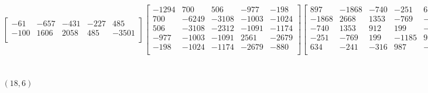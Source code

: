 \documentclass[12pt]{amsart}
\theoremstyle{plain}
\theoremstyle{definition}
\begin{document}
\begin{landscape}
\begin{align*}
\begin{bmatrix}
 -61  &   -657  &   -431  &   -227  &   485  \\ 
 -100  &   1606  &   2058  &   485  &   -3501  \\ 
\end{bmatrix}
\begin{bmatrix}
-1294  &   700  &   506  &   -977  &   -198  \\ 
 700  &   -6249  &   -3108  &   -1003  &   -1024  \\ 
 506  &   -3108  &   -2312  &   -1091  &   -1174  \\ 
 -977  &   -1003  &   -1091  &   2561  &   -2679  \\ 
 -198  &   -1024  &   -1174  &   -2679  &   -880  \\ 
\end{bmatrix}
\begin{bmatrix}
897  &   -1868  &   -740  &   -251  &   634  \\ 
 -1868  &   2668  &   1353  &   -769  &   -241  \\ 
 -740  &   1353  &   912  &   199  &   -316  \\ 
 -251  &   -769  &   199  &   -1185  &   987  \\ 
 634  &   -241  &   -316  &   987  &   -500  \\ 
\end{bmatrix}
\\
(18,6) &:
\begin{bmatrix}
1739  &   -721  &   827  &   -4017  &   -5980  \\ 
 -721  &   -4242  &   89  &   92  &   -3624  \\ 
 827  &   89  &   -2897  &   -3354  &   -490  \\ 
 -4017  &   92  &   -3354  &   -5617  &   2933  \\ 
 -5980  &   -3624  &   -490  &   2933  &   1222  \\ 
\end{bmatrix}
\begin{bmatrix}
4487  &   1033  &   2954  &   -566  &   -6042  \\ 
 1033  &   -1929  &   1527  &   -929  &   -566  \\ 
 2954  &   1527  &   555  &   2096  &   -986  \\ 
 -566  &   -929  &   2096  &   1065  &   321  \\ 
 -6042  &   -566  &   -986  &   321  &   3766  \\ 
\end{bmatrix}
\begin{bmatrix}

\end{bmatrix}
\end{align*}
\end{landscape}
\end{document}
